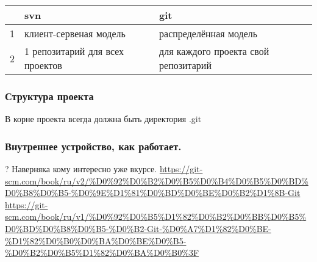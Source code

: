 \begin{center}
\begin{tabular}{rll}
    &  svn                              &  git                                   \\
\hline
 1  &  клиент-сервеная модель           &  распределённая модель                 \\
 2  &  1 репозитарий для всех проектов  &  для каждого проекта свой репозитарий  \\
\end{tabular}
\end{center}
\begin{frame}
\frametitle{Структура проекта}
\label{sec-1-1}

В корне проекта всегда должна быть директория .git
\end{frame}
\begin{frame}
\frametitle{Внутреннее устройство, как работает.}
\label{sec-1-2}

? Наверняка кому интересно уже вкурсе.
\href{https://git-scm.com/book/ru/v2/%D0%92%D0%B2%D0%B5%D0%B4%D0%B5%D0%BD%D0%B8%D0%B5-%D0%9E%D1%81%D0%BD%D0%BE%D0%B2%D1%8B-Git}{https://git-scm.com/book/ru/v2/\%D0\%92\%D0\%B2\%D0\%B5\%D0\%B4\%D0\%B5\%D0\%BD\%D0\%B8\%D0\%B5-\%D0\%9E\%D1\%81\%D0\%BD\%D0\%BE\%D0\%B2\%D1\%8B-Git}
\href{https://git-scm.com/book/ru/v1/%D0%92%D0%B5%D1%82%D0%B2%D0%BB%D0%B5%D0%BD%D0%B8%D0%B5-%D0%B2-Git-%D0%A7%D1%82%D0%BE-%D1%82%D0%B0%D0%BA%D0%BE%D0%B5-%D0%B2%D0%B5%D1%82%D0%BA%D0%B0%3F}{https://git-scm.com/book/ru/v1/\%D0\%92\%D0\%B5\%D1\%82\%D0\%B2\%D0\%BB\%D0\%B5\%D0\%BD\%D0\%B8\%D0\%B5-\%D0\%B2-Git-\%D0\%A7\%D1\%82\%D0\%BE-\%D1\%82\%D0\%B0\%D0\%BA\%D0\%BE\%D0\%B5-\%D0\%B2\%D0\%B5\%D1\%82\%D0\%BA\%D0\%B0\%3F}
\end{frame}
